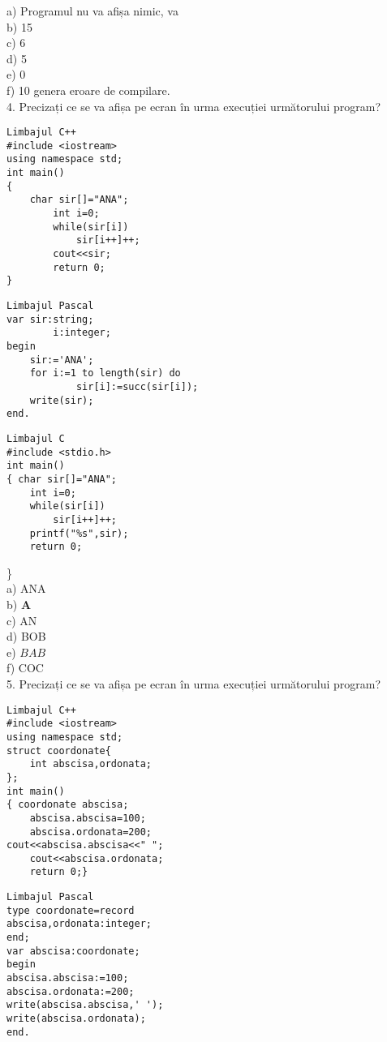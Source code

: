 a) Programul nu va afișa nimic, va\\
b) 15\\
c) 6\\
d) 5\\
e) 0\\
f) 10 genera eroare de compilare.\\
4. Precizați ce se va afișa pe ecran în urma execuției următorului program?

\begin{verbatim}
Limbajul C++
#include <iostream>
using namespace std;
int main()
{
    char sir[]="ANA";
        int i=0;
        while(sir[i])
            sir[i++]++;
        cout<<sir;
        return 0;
}
\end{verbatim}

\begin{verbatim}
Limbajul Pascal
var sir:string;
        i:integer;
begin
    sir:='ANA';
    for i:=1 to length(sir) do
            sir[i]:=succ(sir[i]);
    write(sir);
end.
\end{verbatim}

\begin{verbatim}
Limbajul C
#include <stdio.h>
int main()
{ char sir[]="ANA";
    int i=0;
    while(sir[i])
        sir[i++]++;
    printf("%s",sir);
    return 0;
\end{verbatim}

\}\\
a) ANA\\
b) $\mathbf{A}$\\
c) AN\\
d) BOB\\
e) $B A B$\\
f) COC\\
5. Precizați ce se va afișa pe ecran în urma execuției următorului program?

\begin{verbatim}
Limbajul C++
#include <iostream>
using namespace std;
struct coordonate{
    int abscisa,ordonata;
};
int main()
{ coordonate abscisa;
    abscisa.abscisa=100;
    abscisa.ordonata=200;
cout<<abscisa.abscisa<<" ";
    cout<<abscisa.ordonata;
    return 0;}
\end{verbatim}

\begin{verbatim}
Limbajul Pascal
type coordonate=record
abscisa,ordonata:integer;
end;
var abscisa:coordonate;
begin
abscisa.abscisa:=100;
abscisa.ordonata:=200;
write(abscisa.abscisa,' ');
write(abscisa.ordonata);
end.
\end{verbatim}

